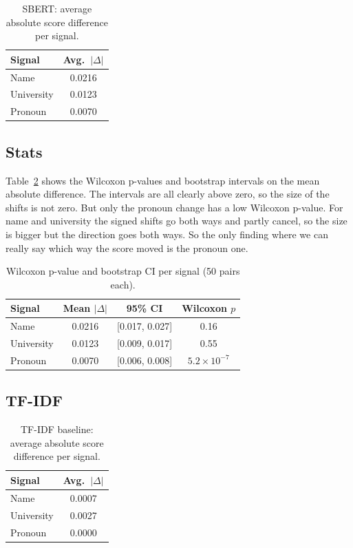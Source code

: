 \documentclass{article}
\begin{document}
\begin{table}[t]
\caption{SBERT: average absolute score difference per signal.}
\label{tab:fairness}
\centering
\begin{tabular}{lc}
\toprule
Signal & Avg.\ $|\Delta|$ \\
\midrule
Name        & 0.0216 \\
University  & 0.0123 \\
Pronoun     & 0.0070 \\
\bottomrule
\end{tabular}
\end{table}

\subsection{Stats}

Table~\ref{tab:stats} shows the Wilcoxon p-values and bootstrap intervals on the mean absolute difference. The intervals are all clearly above zero, so the size of the shifts is not zero. But only the pronoun change has a low Wilcoxon p-value. For name and university the signed shifts go both ways and partly cancel, so the size is bigger but the direction goes both ways. So the only finding where we can really say which way the score moved is the pronoun one.

\begin{table}[t]
\caption{Wilcoxon p-value and bootstrap CI per signal (50 pairs each).}
\label{tab:stats}
\centering
\begin{tabular}{lccc}
\toprule
Signal & Mean $|\Delta|$ & 95\% CI & Wilcoxon $p$ \\
\midrule
Name        & 0.0216 & [0.017, 0.027] & 0.16 \\
University  & 0.0123 & [0.009, 0.017] & 0.55 \\
Pronoun     & 0.0070 & [0.006, 0.008] & $5.2\!\times\!10^{-7}$ \\
\bottomrule
\end{tabular}
\end{table}

\subsection{TF-IDF}

\begin{table}[t]
\caption{TF-IDF baseline: average absolute score difference per signal.}
\label{tab:tfidf}
\centering
\begin{tabular}{lc}
\toprule
Signal & Avg.\ $|\Delta|$ \\
\midrule
Name        & 0.0007 \\
University  & 0.0027 \\
Pronoun     & 0.0000 \\
\bottomrule
\end{tabular}
\end{table}
\end{document}
